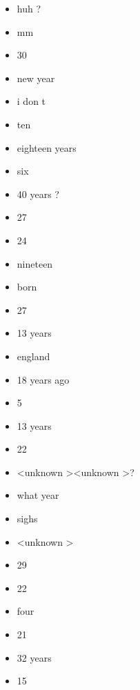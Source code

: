 \begin{multicols}{4}
\begin{itemize}[noitemsep]
		\item huh ?
		\item mm
		\item 30
		\item new year
		\item i don t
		\item ten
		\item eighteen years
		\item six
		\item 40 years ?
		\item 27
		\item 24
		\item nineteen
		\item born
		\item 27
		\item 13 years
		\item england
		\item 18 years ago
		\item 5
		\item 13 years
		\item 22
		\item \textless unknown \textgreater \textless unknown \textgreater ?
		\item what year
		\item sighs
		\item \textless unknown \textgreater
		\item 29
		\item 22
		\item four
		\item 21
		\item 32 years
		\item 15
	\end{itemize}
\end{multicols}

